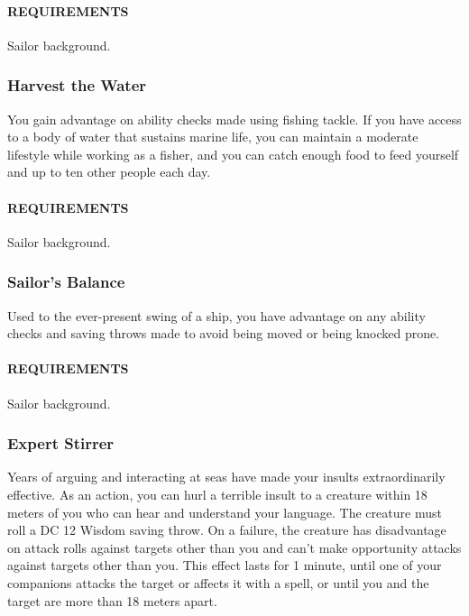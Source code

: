         \paragraph{REQUIREMENTS} Sailor background.

    \subsubsection{Harvest the Water} \label{feat::harvestthewater}
        You gain advantage on ability checks made using fishing tackle.
        If you have access to a body of water that sustains marine life, you can maintain a moderate lifestyle while working as a fisher, and you can catch enough food to feed yourself and up to ten other people each day.
        \paragraph{REQUIREMENTS} Sailor background.

    \subsubsection{Sailor's Balance} \label{feat::sailorsbalance}
        Used to the ever-present swing of a ship, you have advantage on any ability checks and saving throws made to avoid being moved or being knocked prone.
        \paragraph{REQUIREMENTS} Sailor background.

    \subsubsection{Expert Stirrer} \label{feat::expertstirrer}
        Years of arguing and interacting at seas have made your insults extraordinarily effective.
        As an action, you can hurl a terrible insult to a creature within 18 meters of you who can hear and understand your language.
        The creature must roll a DC 12 Wisdom saving throw.
        On a failure, the creature has disadvantage on attack rolls against targets other than you and can't make opportunity attacks against targets other than you.
        This effect lasts for 1 minute, until one of your companions attacks the target or affects it with a spell, or until you and the target are more than 18 meters apart.

